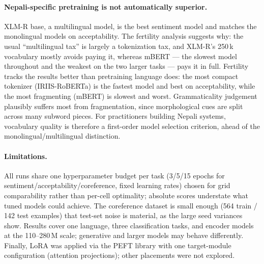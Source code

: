 \paragraph{Nepali-specific pretraining is not automatically superior.}
XLM-R base, a multilingual model, is the best sentiment model and matches
the monolingual models on acceptability. The fertility analysis suggests
why: the usual ``multilingual tax'' is largely a tokenization tax, and
XLM-R's 250\,k vocabulary mostly avoids paying it, whereas mBERT --- the
slowest model throughout and the weakest on the two larger tasks --- pays
it in full. Fertility tracks
the results better than pretraining language does: the most compact
tokenizer (IRIIS-RoBERTa) is the fastest model and best on acceptability,
while the most fragmenting (mBERT) is slowest and worst. Grammaticality
judgement plausibly suffers most from fragmentation, since morphological
cues are split across many subword pieces. For practitioners building
Nepali systems, vocabulary quality is therefore a first-order model
selection criterion, ahead of the monolingual/multilingual distinction.

\paragraph{Limitations.}
All runs share one hyperparameter budget per task (3/5/15 epochs for
sentiment/acceptability/coreference, fixed learning rates)
chosen for grid comparability rather than per-cell optimality; absolute
scores understate what tuned models could achieve. The coreference dataset
is small enough (564 train / 142 test examples) that test-set noise is
material, as the large seed variances show. Results cover one language,
three classification tasks, and encoder models at the 110--280\,M scale;
generative and larger models may behave differently. Finally, LoRA was
applied via the PEFT library \citep{mangrulkar2022peft} with one
target-module configuration (attention projections); other
placements were not explored.
